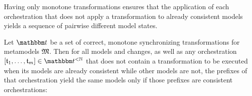 Having only monotone transformations ensures that the application of each orchestration that does not apply a transformation to already consistent models yields a sequence of pairwise different model states.
\begin{lemma}
    \label{lemma:monotonetransformationsnosamestates}
    Let $\transformationset{T}$ be a set of correct, monotone synchronizing transformations for metamodels $\metamodeltuple{M}$.
    Then for all models and changes, as well as any orchestration $\sequenced{\transformation{t}_{1}, \dots, \transformation{t}_{m}} \in \transformationset{T}^{< \mathbb{N}}$ that does not contain a transformation to be executed when its models are already consistent while other models are not, the prefixes of that orchestration yield the same models only if those prefixes are consistent orchestrations:
\end{lemma}

